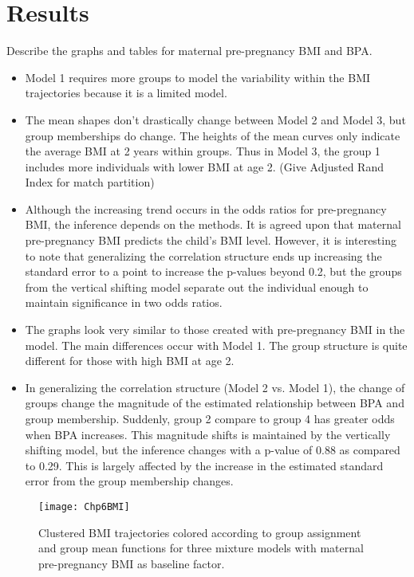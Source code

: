 \documentclass[11pt]{article}
\begin{document}
\section{Results}
Describe the graphs and tables for maternal pre-pregnancy BMI and BPA.
\begin{itemize}
\item Model 1 requires more groups to model the variability within the BMI trajectories because it is a limited model. 
\item The mean shapes don't drastically change between Model 2 and Model 3, but group memberships do change. The heights of the mean curves only indicate the average BMI at 2 years within groups. Thus in Model 3, the group 1 includes more individuals with lower BMI at age 2. (Give Adjusted Rand Index for match partition)
\item Although the increasing trend occurs in the odds ratios for pre-pregnancy BMI, the inference depends on the methods. It is agreed upon that maternal pre-pregnancy BMI predicts the child's BMI level. However, it is interesting to note that generalizing the correlation structure ends up increasing the standard error to a point to increase the p-values beyond 0.2, but the groups from the vertical shifting model separate out the individual enough to maintain significance in two odds ratios. 
\item The graphs look very similar to those created with pre-pregnancy BMI in the model. The main differences occur with Model 1. The group structure is quite different for those with high BMI at age 2. 
\item In generalizing the correlation structure (Model 2 vs. Model 1), the change of groups change the magnitude of the estimated relationship between BPA and group membership. Suddenly, group 2 compare to group 4 has greater odds when BPA increases. This magnitude shifts is maintained by the vertically shifting model, but the inference changes with a p-value of 0.88 as compared to 0.29. This is largely affected by the increase in the estimated standard error from the group membership changes.
\end{itemize} 
\begin{figure}[h]
\begin{center}
\texttt{[image: Chp6BMI]}
\end{center}
\label{fig:dataresults}
\caption{Clustered BMI trajectories colored according to group assignment and group mean functions for three mixture models with maternal pre-pregnancy BMI as baseline factor.}
\end{figure}
\end{document}

